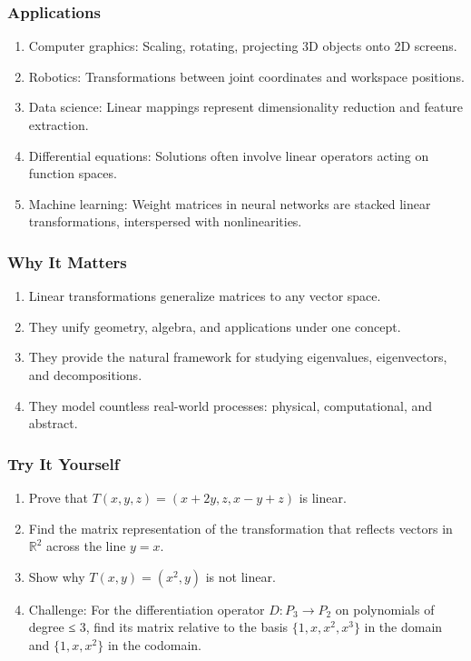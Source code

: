 \documentclass[
  letterpaper,
  DIV=11,
  numbers=noendperiod]{scrreprt}
\providecommand{\tightlist}{%
  \setlength{\itemsep}{0pt}\setlength{\parskip}{0pt}}
\begin{document}
\subsubsection{Applications}\label{applications-4}

\begin{enumerate}
\def\labelenumi{\arabic{enumi}.}
\tightlist
\item
  Computer graphics: Scaling, rotating, projecting 3D objects onto 2D
  screens.
\item
  Robotics: Transformations between joint coordinates and workspace
  positions.
\item
  Data science: Linear mappings represent dimensionality reduction and
  feature extraction.
\item
  Differential equations: Solutions often involve linear operators
  acting on function spaces.
\item
  Machine learning: Weight matrices in neural networks are stacked
  linear transformations, interspersed with nonlinearities.
\end{enumerate}

\subsubsection{Why It Matters}\label{why-it-matters-37}

\begin{enumerate}
\def\labelenumi{\arabic{enumi}.}
\tightlist
\item
  Linear transformations generalize matrices to any vector space.
\item
  They unify geometry, algebra, and applications under one concept.
\item
  They provide the natural framework for studying eigenvalues,
  eigenvectors, and decompositions.
\item
  They model countless real-world processes: physical, computational,
  and abstract.
\end{enumerate}

\subsubsection{Try It Yourself}\label{try-it-yourself-40}

\begin{enumerate}
\def\labelenumi{\arabic{enumi}.}
\tightlist
\item
  Prove that \(T(x,y,z) = (x+2y, z, x-y+z)\) is linear.
\item
  Find the matrix representation of the transformation that reflects
  vectors in \(\mathbb{R}^2\) across the line \(y=x\).
\item
  Show why \(T(x,y) = (x^2,y)\) is not linear.
\item
  Challenge: For the differentiation operator \(D: P_3 \to P_2\) on
  polynomials of degree ≤ 3, find its matrix relative to the basis
  \(\{1,x,x^2,x^3\}\) in the domain and \(\{1,x,x^2\}\) in the codomain.
\end{enumerate}
\end{document}
